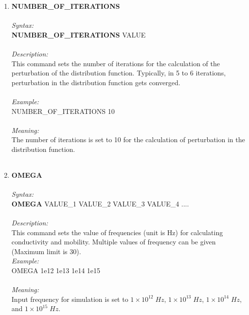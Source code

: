 \documentclass[12pt]{article}
\begin{document}
\begin{enumerate}
    \item \textbf{NUMBER\_OF\_ITERATIONS }     \\ \\
    \textit{Syntax:} \\
    \textbf{NUMBER\_OF\_ITERATIONS} VALUE \\ \\
    \textit{Description:} \\
    This command sets the number of iterations for the calculation of the perturbation of the distribution function. Typically, in 5 to 6 iterations, perturbation in the distribution function gets converged. \\ \\
    \textit{Example:} \\
    NUMBER\_OF\_ITERATIONS 10 \\ \\
    \textit{Meaning:} \\    
    The number of iterations is set to 10 for the calculation of perturbation in the distribution function. \\ \\
    
    \item \textbf{OMEGA}   \\ \\
    \textit{Syntax:} \\
    \textbf{OMEGA} VALUE\_1 VALUE\_2 VALUE\_3 VALUE\_4 .... \\ \\
    \textit{Description:} \\
    This command sets the value of frequencies (unit is Hz) for calculating conductivity and mobility. Multiple values of frequency can be given (Maximum limit is 30). \\
    \textit{Example:} \\
    OMEGA 1e12 1e13 1e14 1e15 \\ \\
    \textit{Meaning:} \\    
    Input frequency for simulation is set to $1 \times 10^{12} \; Hz$, $1 \times 10^{13} \; Hz$, $1 \times 10^{14} \; Hz$, and $1 \times 10^{15} \; Hz$. \\ \\



\end{enumerate}
\end{document}
